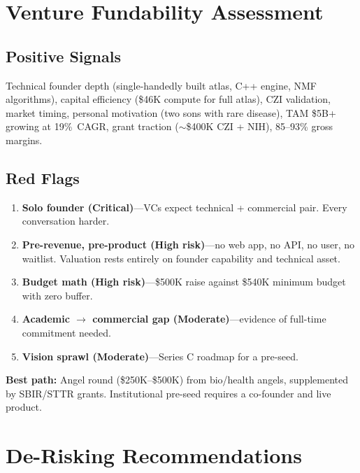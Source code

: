 \documentclass[10pt,twocolumn,letterpaper]{article}
\begin{document}
\section{Venture Fundability Assessment}
\label{sec:fundability}

\subsection{Positive Signals}

Technical founder depth (single-handedly built atlas, C++ engine, NMF
algorithms), capital efficiency (\$46K compute for full atlas), CZI validation,
market timing, personal motivation (two sons with rare disease), TAM \$5B+
growing at 19\%~CAGR, grant traction ($\sim$\$400K CZI + NIH), 85--93\% gross
margins.

\subsection{Red Flags}

\begin{enumerate}
  \item \textbf{Solo founder (Critical)}---VCs expect technical + commercial
    pair. Every conversation harder.
  \item \textbf{Pre-revenue, pre-product (High risk)}---no web app, no API, no
    user, no waitlist. Valuation rests entirely on founder capability and
    technical asset.
  \item \textbf{Budget math (High risk)}---\$500K raise against \$540K minimum
    budget with zero buffer.
  \item \textbf{Academic $\to$ commercial gap (Moderate)}---evidence of
    full-time commitment needed.
  \item \textbf{Vision sprawl (Moderate)}---Series C roadmap for a pre-seed.
\end{enumerate}

\textbf{Best path:} Angel round (\$250K--\$500K) from bio/health angels,
supplemented by SBIR/STTR grants. Institutional pre-seed requires a co-founder
and live product.

\section{De-Risking Recommendations}
\label{sec:derisk}
\end{document}
